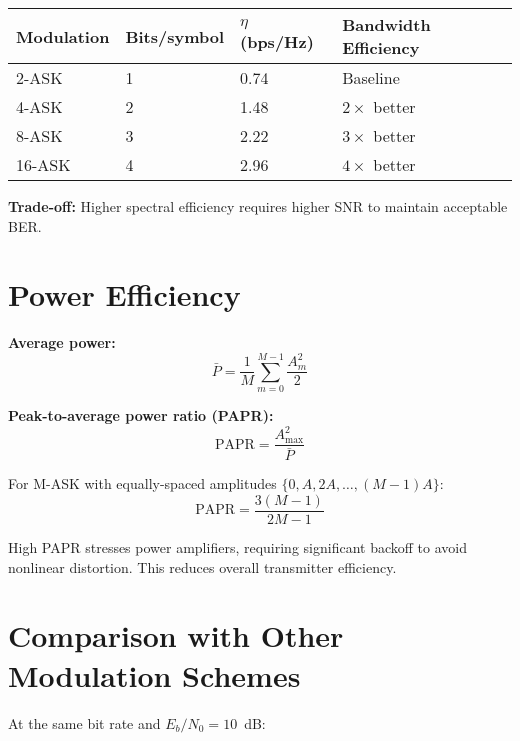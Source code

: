 \begin{center}
\begin{tabular}{@{}llll@{}}
\toprule
Modulation & Bits/symbol & $\eta$ (bps/Hz) & Bandwidth Efficiency \\
\midrule
2-ASK & 1 & 0.74 & Baseline \\
4-ASK & 2 & 1.48 & $2\times$ better \\
8-ASK & 3 & 2.22 & $3\times$ better \\
16-ASK & 4 & 2.96 & $4\times$ better \\
\bottomrule
\end{tabular}
\end{center}

\textbf{Trade-off:} Higher spectral efficiency requires higher SNR to maintain acceptable BER.

\section{Power Efficiency}

\textbf{Average power:}
\begin{equation}
\bar{P} = \frac{1}{M} \sum_{m=0}^{M-1} \frac{A_m^2}{2}
\end{equation}

\textbf{Peak-to-average power ratio (PAPR):}
\begin{equation}
\mathrm{PAPR} = \frac{A_{\max}^2}{\bar{P}}
\end{equation}

For M-ASK with equally-spaced amplitudes $\{0, A, 2A, \ldots, (M-1)A\}$:
\begin{equation}
\mathrm{PAPR} = \frac{3(M-1)}{2M-1}
\end{equation}

\begin{warningbox}
High PAPR stresses power amplifiers, requiring significant backoff to avoid nonlinear distortion. This reduces overall transmitter efficiency.
\end{warningbox}

\section{Comparison with Other Modulation Schemes}

At the same bit rate and $E_b/N_0 = 10$~dB:

